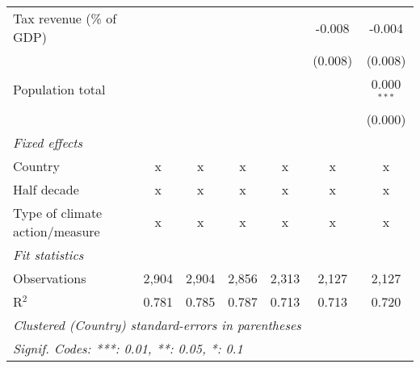 \begin{tabular}{lcccccc}
   Tax revenue (\% of GDP)              &         &               &                &               & -0.008        & -0.004\\   
                                        &         &               &                &               & (0.008)       & (0.008)\\   
   Population total                     &         &               &                &               &               & 0.000$^{***}$\\   
                                        &         &               &                &               &               & (0.000)\\   
   \emph{Fixed effects}\\
   Country                              & x       & x             & x              & x             & x             & x\\  
   Half decade                          & x       & x             & x              & x             & x             & x\\  
   Type of climate action/measure       & x       & x             & x              & x             & x             & x\\  
   \midrule \emph{Fit statistics}\\
   Observations                         & 2,904   & 2,904         & 2,856          & 2,313         & 2,127         & 2,127\\  
   R$^2$                                & 0.781   & 0.785         & 0.787          & 0.713         & 0.713         & 0.720\\  
   \midrule
   \multicolumn{7}{l}{\emph{Clustered (Country) standard-errors in parentheses}}\\
   \multicolumn{7}{l}{\emph{Signif. Codes: ***: 0.01, **: 0.05, *: 0.1}}\\
\end{tabular}
\par\endgroup


